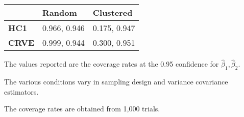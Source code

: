 \begin{threeparttable}
	\begin{tabularx}{\textwidth}{Y Y Y}
		\toprule
		& \textbf{Random}       & \textbf{Clustered} \\
		\midrule
		\textbf{HC1}  & 0.966, 0.946 & 0.175, 0.947 \\
		\textbf{CRVE} & 0.999, 0.944 & 0.300, 0.951\\
		\bottomrule
	\end{tabularx}
	\begin{tablenotes}
		\small
		\item The values reported are the coverage rates at the 0.95 confidence for $\hat{\beta}_{1}, \hat{\beta}_{2}$.
		\item The various conditions vary in sampling design and variance covariance estimators.
		\item The coverage rates are obtained from 1,000 trials.
	\end{tablenotes}
\end{threeparttable}